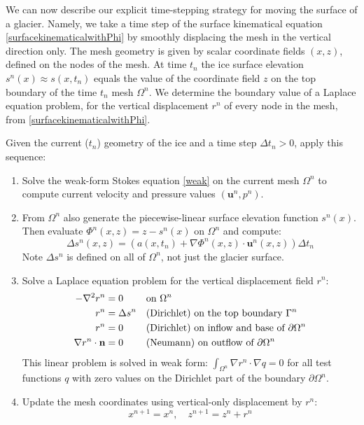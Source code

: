 \documentclass[letterpaper,final,12pt,reqno]{amsart}
\newcommand{\grad}{\nabla}
\newcommand{\bn}{\mathbf{n}}
\newcommand{\bu}{\mathbf{u}}
\begin{document}
We can now describe our explicit time-stepping strategy for moving the surface of a glacier.  Namely, we take a time step of the surface kinematical equation \eqref{surfacekinematicalwithPhi} by smoothly displacing the mesh in the vertical direction only.  The mesh geometry is given by scalar coordinate fields $(x,z)$, defined on the nodes of the mesh.  At time $t_n$ the ice surface elevation $s^n(x) \approx s(x,t_n)$ equals the value of the coordinate field $z$ on the top boundary of the time $t_n$ mesh $\Omega^n$.  We determine the boundary value of a Laplace equation problem, for the vertical displacement $r^n$ of every node in the mesh, from \eqref{surfacekinematicalwithPhi}.

Given the current ($t_n$) geometry of the ice and a time step $\Delta t_n > 0$, apply this sequence:

\medskip
\renewcommand{\labelenumi}{\emph{\arabic{enumi}.}}
\begin{enumerate}
\item Solve the weak-form Stokes equation \eqref{weak} on the current mesh $\Omega^n$ to compute current velocity and pressure values $(\bu^n,p^n)$.
\item From $\Omega^n$ also generate the piecewise-linear surface elevation function $s^n(x)$.  Then evaluate $\Phi^n(x,z) = z - s^n(x)$ on $\Omega^n$ and compute:
\begin{equation}
\Delta s^n(x,z) =  \left(a(x,t_n) + \grad \Phi^n(x,z)\cdot \bu^n(x,z)\right)\Delta t_n \label{deltahfield}
\end{equation}
Note $\Delta s^n$ is defined on all of $\Omega^n$, not just the glacier surface.
\item Solve a Laplace equation problem for the vertical displacement field $r^n$:
\begin{align}
- \grad^2 r^n &= 0 & &\text{on } \Omega^n \label{vdisplacementpoisson} \\
          r^n &= \Delta s^n & &\text{(Dirichlet) on the top boundary } \Gamma^n \notag \\
          r^n &= 0 & &\text{(Dirichlet) on inflow and base of } \partial \Omega^n \notag \\
\grad r^n\cdot \bn &= 0 & &\text{(Neumann) on outflow of } \partial \Omega^n \notag
\end{align}
This linear problem is solved in weak form: $\int_{\Omega^n} \grad r^n\cdot \grad q = 0$ for all test functions $q$ with zero values on the Dirichlet part of the boundary $\partial \Omega^n$.
\item Update the mesh coordinates using vertical-only displacement by $r^n$:
\begin{equation}
  x^{n+1} = x^n, \quad z^{n+1} = z^n + r^n \label{updatemesh}
\end{equation}
\end{enumerate}
\end{document}
